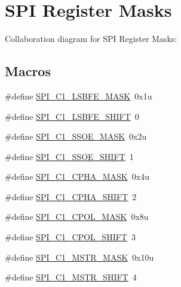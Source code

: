 \hypertarget{group___s_p_i___register___masks}{}\section{S\+PI Register Masks}
\label{group___s_p_i___register___masks}
Collaboration diagram for S\+PI Register Masks\+:
\subsection*{Macros}
\begin{DoxyCompactItemize}
\item 
\#define \hyperlink{group___s_p_i___register___masks_ga45f4cb42020607c9ed927bf57cc0ee31}{S\+P\+I\+\_\+\+C1\+\_\+\+L\+S\+B\+F\+E\+\_\+\+M\+A\+SK}~0x1u
\item 
\#define \hyperlink{group___s_p_i___register___masks_gaa81af414d42c393342df48ae8d44c27f}{S\+P\+I\+\_\+\+C1\+\_\+\+L\+S\+B\+F\+E\+\_\+\+S\+H\+I\+FT}~0
\item 
\#define \hyperlink{group___s_p_i___register___masks_ga18d4e12a34e268e98cf29ef47ff46e21}{S\+P\+I\+\_\+\+C1\+\_\+\+S\+S\+O\+E\+\_\+\+M\+A\+SK}~0x2u
\item 
\#define \hyperlink{group___s_p_i___register___masks_gaa5941a1db540652e8da7f3881eb39384}{S\+P\+I\+\_\+\+C1\+\_\+\+S\+S\+O\+E\+\_\+\+S\+H\+I\+FT}~1
\item 
\#define \hyperlink{group___s_p_i___register___masks_gaaf85a831465f0f4f302657b32171f2e6}{S\+P\+I\+\_\+\+C1\+\_\+\+C\+P\+H\+A\+\_\+\+M\+A\+SK}~0x4u
\item 
\#define \hyperlink{group___s_p_i___register___masks_gaa305ee06e9cb66ad7ba9aed297debef3}{S\+P\+I\+\_\+\+C1\+\_\+\+C\+P\+H\+A\+\_\+\+S\+H\+I\+FT}~2
\item 
\#define \hyperlink{group___s_p_i___register___masks_ga8f4bd038e37f3581231f26aafc33c7b1}{S\+P\+I\+\_\+\+C1\+\_\+\+C\+P\+O\+L\+\_\+\+M\+A\+SK}~0x8u
\item 
\#define \hyperlink{group___s_p_i___register___masks_ga1d5b3d92574037e1073a569653cf5a9b}{S\+P\+I\+\_\+\+C1\+\_\+\+C\+P\+O\+L\+\_\+\+S\+H\+I\+FT}~3
\item 
\#define \hyperlink{group___s_p_i___register___masks_ga747d64528ec249cad76dc87b67e457e6}{S\+P\+I\+\_\+\+C1\+\_\+\+M\+S\+T\+R\+\_\+\+M\+A\+SK}~0x10u
\item 
\#define \hyperlink{group___s_p_i___register___masks_ga67f4db47142cf9e5cb239db0f5af79d7}{S\+P\+I\+\_\+\+C1\+\_\+\+M\+S\+T\+R\+\_\+\+S\+H\+I\+FT}~4
\item 

\end{DoxyCompactItemize}
